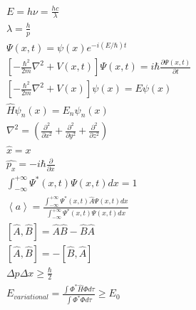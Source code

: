 \begin{align*}
&E=h\nu = \frac{hc}{\lambda}\\
&\lambda = \frac{h}{p}\\
&\Psi\left(x,t\right) = \psi\left(x\right)e^{-i\left(E/\hbar\right)t}\\
&\left[-\frac{\hbar^2}{2m} \nabla^2+ V\left(x,t\right)\right]\Psi\left(x,t\right) = i\hbar \frac{\partial \Psi\left(x,t\right)}{\partial t}\\
&\left[-\frac{\hbar^2}{2m} \nabla^2+ V\left(x\right)\right]\psi\left(x\right) = E\psi\left(x\right)\\
&\hat{H}\psi_n\left(x\right) = E_n\psi_n\left(x\right)\\
&\nabla^2 = \left(\frac{\partial^2}{\partial x^2} +\frac{\partial^2}{\partial y^2} +\frac{\partial^2}{\partial z^2} \right)\\
&\hat{x}=x\\
&\hat{p_x}=-i\hbar \frac{\partial}{\partial x}\\
&\int_{-\infty}^{+\infty}\Psi^*\left(x,t\right)\Psi\left(x,t\right)dx=1\\
&\left<a\right> = \frac{\int_{-\infty}^{+\infty}\Psi^*\left(x,t\right)\hat{A}\Psi\left(x,t\right)dx}{\int_{-\infty}^{+\infty}\Psi^*\left(x,t\right)\Psi\left(x,t\right)dx}\\
&\left[\hat{A},\hat{B}\right] = \hat{A}\hat{B} - \hat{B}\hat{A}\\
&\left[\hat{A},\hat{B}\right] = -\left[\hat{B},\hat{A}\right]\\
&\Delta p\Delta x \geq \frac{\hbar}{2}\\
&E_{variational} = \frac{\int \Phi^*\hat{H}\Phi d\tau}{\int \Phi^*\Phi d\tau}\geq E_0\\
\end{align*}
